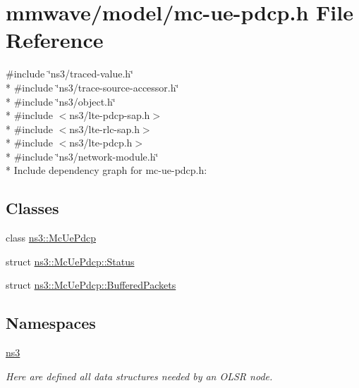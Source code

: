 \hypertarget{mmwave_2model_2mc-ue-pdcp_8h}{}\section{mmwave/model/mc-\/ue-\/pdcp.h File Reference}
\label{mmwave_2model_2mc-ue-pdcp_8h}
{\ttfamily \#include \char`\"{}ns3/traced-\/value.\+h\char`\"{}}\\*
{\ttfamily \#include \char`\"{}ns3/trace-\/source-\/accessor.\+h\char`\"{}}\\*
{\ttfamily \#include \char`\"{}ns3/object.\+h\char`\"{}}\\*
{\ttfamily \#include $<$ns3/lte-\/pdcp-\/sap.\+h$>$}\\*
{\ttfamily \#include $<$ns3/lte-\/rlc-\/sap.\+h$>$}\\*
{\ttfamily \#include $<$ns3/lte-\/pdcp.\+h$>$}\\*
{\ttfamily \#include \char`\"{}ns3/network-\/module.\+h\char`\"{}}\\*
Include dependency graph for mc-\/ue-\/pdcp.h\+:
\subsection*{Classes}
\begin{DoxyCompactItemize}
\item 
class \hyperlink{classns3_1_1McUePdcp}{ns3\+::\+Mc\+Ue\+Pdcp}
\item 
struct \hyperlink{structns3_1_1McUePdcp_1_1Status}{ns3\+::\+Mc\+Ue\+Pdcp\+::\+Status}
\item 
struct \hyperlink{structns3_1_1McUePdcp_1_1BufferedPackets}{ns3\+::\+Mc\+Ue\+Pdcp\+::\+Buffered\+Packets}
\end{DoxyCompactItemize}
\subsection*{Namespaces}
\begin{DoxyCompactItemize}
\item 
 \hyperlink{namespacens3}{ns3}
\begin{DoxyCompactList}\small\item\em Here are defined all data structures needed by an O\+L\+SR node. \end{DoxyCompactList}\end{DoxyCompactItemize}
